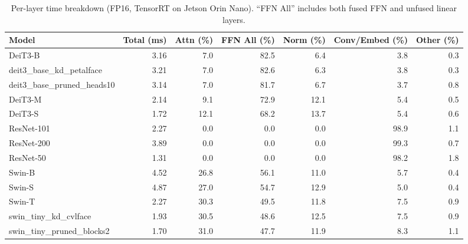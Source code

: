 \begin{table}[t]
\centering
\caption{Per-layer time breakdown (FP16, TensorRT on Jetson Orin Nano).
``FFN All'' includes both fused FFN and unfused linear layers.}
\label{tab:layer-breakdown}
\footnotesize
\begin{tabular*}{\linewidth}{@{\extracolsep{\fill}} l r r r r r r}
\toprule
Model & Total (ms) & Attn (\%) & FFN All (\%) & Norm (\%) & Conv/Embed (\%) & Other (\%) \\
\midrule
DeiT3-B & 3.16 & 7.0 & 82.5 & 6.4 & 3.8 & 0.3 \\
deit3_base_kd_petalface & 3.21 & 7.0 & 82.6 & 6.3 & 3.8 & 0.3 \\
deit3_base_pruned_heads10 & 3.14 & 7.0 & 81.7 & 6.7 & 3.7 & 0.8 \\
DeiT3-M & 2.14 & 9.1 & 72.9 & 12.1 & 5.4 & 0.5 \\
DeiT3-S & 1.72 & 12.1 & 68.2 & 13.7 & 5.4 & 0.6 \\
ResNet-101 & 2.27 & 0.0 & 0.0 & 0.0 & 98.9 & 1.1 \\
ResNet-200 & 3.89 & 0.0 & 0.0 & 0.0 & 99.3 & 0.7 \\
ResNet-50 & 1.31 & 0.0 & 0.0 & 0.0 & 98.2 & 1.8 \\
Swin-B & 4.52 & 26.8 & 56.1 & 11.0 & 5.7 & 0.4 \\
Swin-S & 4.87 & 27.0 & 54.7 & 12.9 & 5.0 & 0.4 \\
Swin-T & 2.27 & 30.3 & 49.5 & 11.8 & 7.5 & 0.9 \\
swin_tiny_kd_cvlface & 1.93 & 30.5 & 48.6 & 12.5 & 7.5 & 0.9 \\
swin_tiny_pruned_blocks2 & 1.70 & 31.0 & 47.7 & 11.9 & 8.3 & 1.1 \\
\bottomrule
\end{tabular*}
\end{table}
